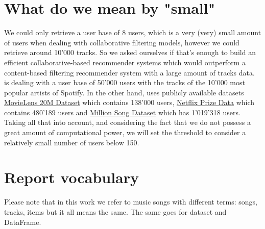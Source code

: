 \section{What do we mean by "small"}
We could only retrieve a user base of 8 users, which is a very (very) small amount of users when dealing with collaborative filtering models, however we could retrieve around 10'000 tracks. So we asked ourselves if that's enough to build an efficient collaborative-based recommender systems which would outperform a content-based filtering recommender system with a large amount of tracks data. \cite{johnson_logistic_matrix_factorization} is dealing with a user base of 50'000 users with the tracks of the 10'000 most popular artists of Spotify. In the other hand, \cite{liang2018variational} uses publicly available datasets \href{https://grouplens.org/datasets/movielens/20m/}{MovieLens 20M Dataset} which contains 138'000 users, \href{https://www.kaggle.com/datasets/netflix-inc/netflix-prize-data}{Netflix Prize Data} which contains 480'189 users and \href{http://millionsongdataset.com/tasteprofile/}{Million Song Dataset} which has 1'019'318 users. Taking all that into account, and considering the fact that we do not possess a great amount of computational power, we will set the threshold to consider a relatively small number of users below 150.

\section{Report vocabulary}
Please note that in this work we refer to music songs with different terms: songs, tracks, items but it all means the same. The same goes for dataset and DataFrame.
